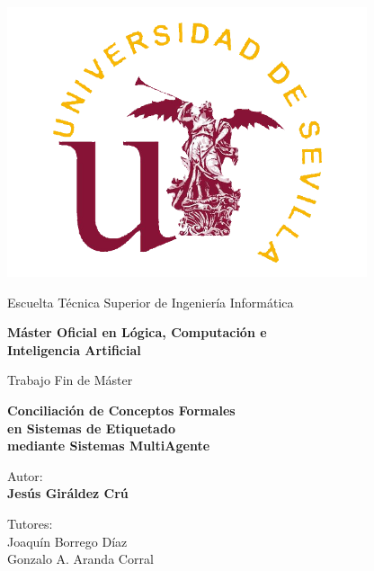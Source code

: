 \thispagestyle{empty}

{


\thispagestyle{empty}
\begin{center}
\includegraphics[scale=.6]{img/logous}
\end{center}

\vspace*{0cm}
\Large 

\begin{center}

{\normalsize \sc Escuelta Técnica Superior de Ingeniería Informática}

{\large \bf Máster Oficial en Lógica, Computación e\\ Inteligencia Artificial }

\vspace*{1.5cm}

{\sc Trabajo Fin de Máster}


{\LARGE \bf Conciliación de Conceptos Formales \\ en Sistemas de Etiquetado\\ mediante Sistemas MultiAgente}

\end{center} 




\vspace*{0.5cm}

\begin{center}
{\normalsize Autor: \\ {\bf Jesús Giráldez Crú}}
\end{center}

\begin{center}
{\small Tutores: }
\vspace*{0.2cm}
{\small \\  Joaquín Borrego Díaz \\ Gonzalo A. Aranda Corral}
\end{center}

}
